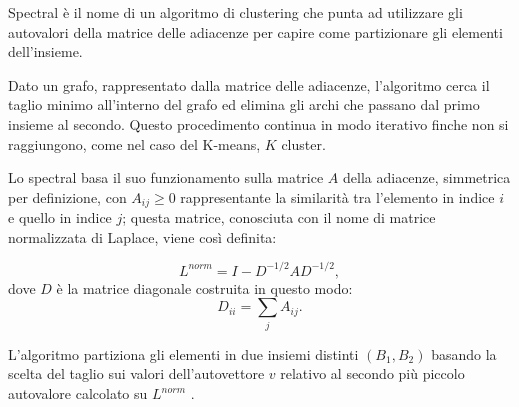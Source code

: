 Spectral è il nome di un algoritmo di clustering che punta ad utilizzare gli autovalori della matrice delle adiacenze per capire come partizionare gli elementi dell'insieme.

Dato un grafo, rappresentato dalla matrice delle adiacenze, l'algoritmo cerca il taglio minimo all'interno del grafo ed elimina gli archi che passano dal primo insieme al secondo. Questo procedimento continua in modo iterativo finche non si raggiungono, come nel caso del K-means, $K$ cluster.

Lo spectral basa il suo funzionamento sulla matrice $A$ della adiacenze, simmetrica per definizione, con $A_{ij}\geq 0$ rappresentante la similarità tra l'elemento in indice $i$ e quello in indice $j$; questa matrice, conosciuta con il nome di matrice normalizzata di Laplace, viene così definita:

\begin{equation*}
	L^{norm} = I-D^{-1/2} A D^{-1/2},
\end{equation*}
dove $D$ è la matrice diagonale costruita in questo modo:
\begin{equation*}
	D_{ii} = \sum_j A_{ij}.
\end{equation*}

L'algoritmo partiziona gli elementi in due insiemi distinti $(B_1, B_2)$ basando la scelta del taglio sui valori dell'autovettore $v$ relativo al secondo più piccolo autovalore calcolato su $L^{norm}$ \cite{spectral_algorithm}.